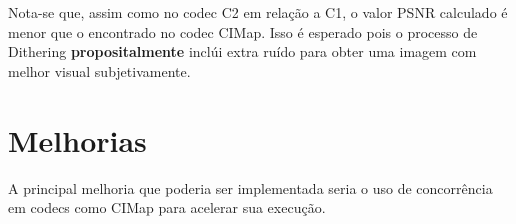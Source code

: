 \documentclass[11pt]{article}
\begin{document}
Nota-se que, assim como no codec C2 em relação a C1,  o valor PSNR calculado é menor que o encontrado no codec CIMap.
Isso é esperado pois o processo de Dithering \textbf{propositalmente} inclúi extra ruído para obter uma imagem com melhor visual
subjetivamente.

\section{Melhorias}
\label{sec:org98c4150}

A principal melhoria que poderia ser implementada seria o uso de concorrência em codecs como
CIMap para acelerar sua execução.
\end{document}
